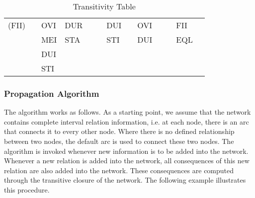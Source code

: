 \documentclass[11pt]{report}
\newenvironment{vvarmargin}[2]
{
  \begin{list}{}
  {
    \setlength{\topsep}{0pt}
    \setlength{\leftmargin}{0pt}
    \setlength{\rightmargin}{0pt}
    \setlength{\listparindent}{\parindent}
    \setlength{\itemindent}{\parindent}
    \setlength{\parsep}{0pt plus 1pt}
    \addtolength{\leftmargin}{#1}\addtolength{\rightmargin}{#2}
  }
  \item
}
{
  \end{list}
}
\begin{document}
\begin{table}[p]
\begin{vvarmargin}{-4cm}{-4cm}
\begin{center}
\begin{tabular}[t]{|r|l|l|l|l|l|l|l|l|l|l|l|l|}
                  (FII)                   &                         & OVI                     & DUR                     &                         &                         & DUI                     &                         & OVI                     &                         &                         & FII                     &                         \\
                                          &                         & MEI                     & STA                     &                         &                         & STI                     &                         & DUI                     &                         &                         & EQL                     &                         \\
                                          &                         & DUI                     &                         &                         &                         &                         &                         &                         &                         &                         &                         &                         \\
                                          &                         & STI                     &                         &                         &                         &                         &                         &                         &                         &                         &                         &                         \\
                  \hline
                \end{tabular}
              \end{center}
              \caption{Transitivity Table}
              \label{tabl-tempo-ttabl}
            \end{vvarmargin}
          \end{table}

        \subsubsection{Propagation Algorithm}

          The algorithm works as follows. As a starting point, we assume that
          the network contains complete interval relation information, i.e. at
          each node, there is an arc that connects it to every other node.
          Where there is no defined relationship between two nodes, the default
          arc is used to connect these two nodes. The algorithm is invoked
          whenever new information is to be added into the network. Whenever a
          new relation is added into the network, all consequences of this new
          relation are also added into the network. These consequences are
          computed through the transitive closure of the network. The following
          example illustrates this procedure.
\end{document}
